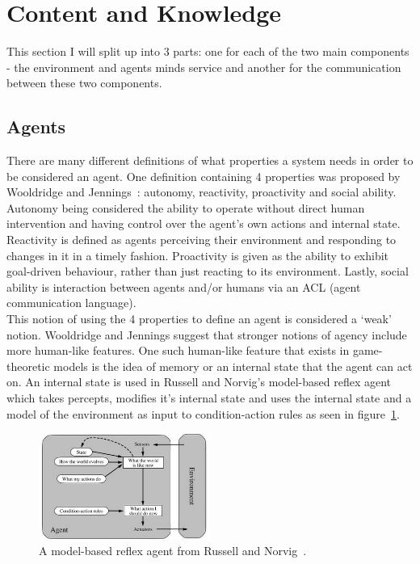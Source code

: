 \documentclass[twoside,twocolumn]{article}
\begin{document}

\section{Content and Knowledge}
This section I will split up into 3 parts: one for each of the two main components - the environment and agents minds service and another for the communication between these two components.
\subsection{Agents}
There are many different definitions of what properties a system needs in order to be considered an agent. One definition containing 4 properties was proposed by Wooldridge and Jennings~\cite{wooldridge_jennings_1995}: autonomy, reactivity, proactivity and social ability.\\
Autonomy being considered the ability to operate without direct human intervention and having control over the agent's own actions and internal state. Reactivity is defined as agents perceiving their environment and responding to changes in it in a timely fashion. Proactivity is given as the ability to exhibit goal-driven behaviour, rather than just reacting to its environment. Lastly, social ability is interaction between agents and/or humans via an ACL (agent communication language).\\
This notion of using the 4 properties to define an agent is considered a `weak' notion. Wooldridge and Jennings suggest that stronger notions of agency include more human-like features. One such human-like feature that exists in game-theoretic models is the idea of memory or an internal state that the agent can act on. An internal state is used in Russell and Norvig's model-based reflex agent which takes percepts, modifies it's internal state and uses the internal state and a model of the environment as input to condition-action rules as seen in figure~\ref{fig:model_reflex}.
\begin{figure}
	\begin{center}
	\includegraphics[width=0.5\textwidth]{RuNorv.png}
	\caption{A model-based reflex agent from Russell and Norvig~\cite{russell2016artificial}.}
	\label{fig:model_reflex}
	\end{center}
\end{figure}
\end{document}

